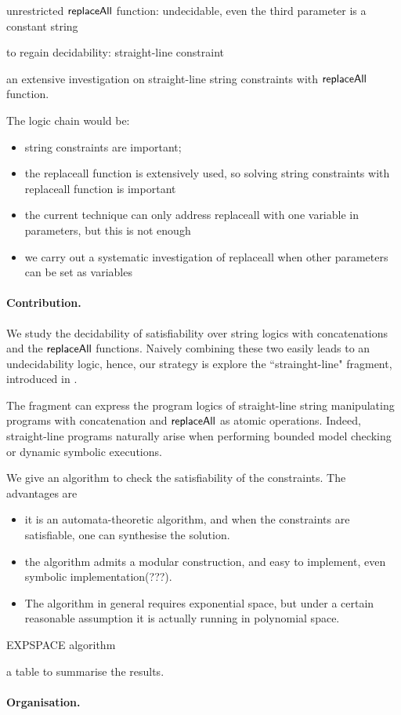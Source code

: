  



\cite{LB16,TCJ16,YABI14}

unrestricted $\mathsf{replaceAll}$ function: undecidable, even the third parameter is a constant string

to regain decidability: straight-line constraint

an extensive investigation on straight-line string constraints with $\mathsf{replaceAll}$ function. 


The logic chain would be:
\begin{itemize}
	\item string constraints are important;
	\item the replaceall function is extensively used, so solving string constraints with replaceall function is important
	\item the current technique \cite{LB16} can only address replaceall with one variable in parameters, but this is not enough
	\item we carry out a systematic investigation of replaceall when other parameters can be set as variables 
\end{itemize}

\paragraph{Contribution.} We study the decidability of satisfiability over string logics with concatenations and the $\mathsf{replaceAll}$ functions. Naively combining these two easily leads to an undecidability logic, hence, our strategy is explore the ``strainght-line" fragment, introduced in \cite{LB16}. 

The fragment can express the program logics of straight-line string manipulating programs with concatenation and $\mathsf{replaceAll}$ as atomic operations. Indeed, straight-line programs naturally arise when performing bounded model checking or dynamic symbolic executions. 

We give an algorithm to check the satisfiability of the constraints. The advantages are 
\begin{itemize}
	\item it is an automata-theoretic algorithm, and when the constraints are satisfiable, one can synthesise the solution. 
	
	\item the algorithm admits a modular construction, and easy to implement, even symbolic implementation(???). 
	
	
	\item The algorithm in general requires exponential space, but under a certain reasonable assumption it is actually running in polynomial space. 
\end{itemize}



EXPSPACE algorithm

a table to summarise the results.


\paragraph{Organisation.} 

